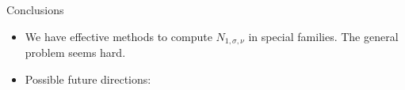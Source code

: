 \documentclass{beamer}
\theoremstyle{definition}
\begin{document}
                                                                                                                                                                                                                          \begin{frame}{Conclusions}
                                                                                                                                                                                                                            \begin{itemize}
                                                                                                                                                                                                                            \item We have effective methods to compute $N_{1,\sigma,\nu}$ in special families. The general problem seems hard.
                                                                                                                                                                                                                            \item Possible future directions:
                                                                                                                                                                                                                              \begin{itemize}


\end{itemize}
\end{itemize}
\end{frame}
\end{document}

